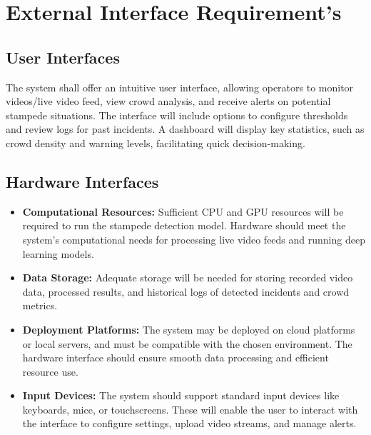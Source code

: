 \documentclass[11pt]{report}
\begin{document}
\section{External Interface Requirement's}
\subsection{User Interfaces}
The system shall offer an intuitive user interface, allowing operators to monitor videos/live video feed, view crowd analysis, and receive alerts on potential stampede situations. The interface will include options to configure thresholds and review logs for past incidents. A dashboard will display key statistics, such as crowd density and warning levels, facilitating quick decision-making.

\subsection{Hardware Interfaces}
\begin{itemize}

    
    \item \textbf{Computational Resources:} Sufficient CPU and GPU resources will be required to run the stampede
    detection model. Hardware should meet the system’s computational needs for processing live video feeds and running deep learning models.
    
    \item \textbf{Data Storage:} Adequate storage will be needed for storing recorded video data, processed results, and historical logs of detected incidents and crowd metrics.
    
    \item \textbf{Deployment Platforms:} The system may be deployed on cloud platforms or local servers, and must be compatible with the chosen environment. The hardware interface should ensure smooth data processing and efficient resource use.

    \item \textbf{Input Devices:} The system should support standard input devices like keyboards, mice, or touchscreens. These will enable the user to interact with the interface to configure settings, upload video streams, and manage alerts. 
\end{itemize}
\end{document}
